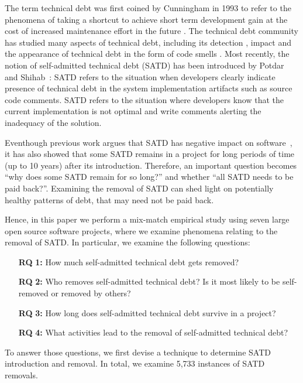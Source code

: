 
The term technical debt was first coined by Cunningham in 1993 to refer to the phenomena of taking a shortcut to achieve short term development gain at the cost of increased maintenance effort in the future \cite{Cunningham1992WPM}. The technical debt community has studied many aspects of technical debt, including its detection \cite{Zazworka2013EASE}, impact \cite{Zazworka2011MTD} and the appearance of technical debt in the form of code smells \cite{Fontana2012MTD}. 
Most recently, the notion of self-admitted technical debt (SATD) has been introduced by Potdar and Shihab~\cite{Potdar2014ICSME}: SATD refers to the situation when developers clearly indicate presence of
technical debt in the system implementation artifacts such as source code comments.
SATD refers to the situation where developers know that the current implementation is not optimal and write comments alerting the inadequacy of the solution. 




Eventhough previous work argues that SATD has negative impact on software~\cite{Wehaibi2016SANER,kameiusingTDA2016}, it has also showed that some SATD remains in a project for long periods of time (up to 10 years) after its introduction. Therefore, an important question becomes ``why does some SATD remain for so long?'' and whether ``all SATD needs to be paid back?''. Examining the removal of SATD can shed light on potentially healthy patterns of debt, that may need not be paid back.

Hence, in this paper we perform a mix-match empirical study using seven large open source software projects, where we examine phenomena relating to the removal of SATD. In particular, we examine the following questions:
\begin{itemize}
	\item[\textbf{RQ}]\textbf{1:} How much self-admitted technical debt gets removed?
	\item[\textbf{RQ}]\textbf{2:} Who removes self-admitted technical debt? Is it most likely to be self-removed or removed by others?
	\item[\textbf{RQ}]\textbf{3:} How long does self-admitted technical debt survive in a project?
	\item[\textbf{RQ}]\textbf{4:} What activities lead to the removal of self-admitted technical debt?
\end{itemize}
To answer those questions, we first devise a technique to determine SATD introduction and removal. In total, we examine 5,733 instances of SATD removals.

